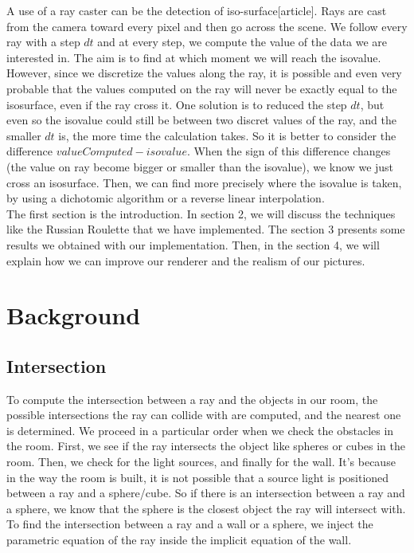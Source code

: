 \documentclass[12pt]{article}
\numberwithin{equation}{section}
\begin{document}
A use of a ray caster can be the detection of iso-surface[article]. Rays are cast from the camera toward every pixel and then go across the scene. We follow every ray with a step $dt$ and at every step, we compute the value of the data we are interested in. The aim is to find at which moment we will reach the isovalue. However, since we discretize the values along the ray, it is possible and even very probable that the values computed on the ray will never be exactly equal to the isosurface, even if the ray cross it. One solution is to reduced the step $dt$, but even so the isovalue could still be between two discret values of the ray, and the smaller $dt$ is, the more time the calculation takes. So it is better to consider the difference $valueComputed - isovalue$. When the sign of this difference changes (the value on ray become bigger or smaller than the isovalue), we know we just cross an isosurface. Then, we can find more precisely where the isovalue is taken, by using a dichotomic algorithm or a reverse linear interpolation.\\

The first section is the introduction. In section 2, we will discuss the techniques like the Russian Roulette that we have implemented. The section 3 presents some results we obtained with our implementation. Then, in the section 4, we will explain how we can improve our renderer and the realism of our pictures. 

\section{Background}

\subsection{Intersection}

To compute the intersection between a ray and the objects in our room, the possible intersections the ray can collide with are computed, and the nearest one is determined. We proceed in a particular order when we check the obstacles in the room. First, we see if the ray intersects the object like spheres or cubes in the room. Then, we check for the light sources, and finally for the wall. It's because in the way the room is built, it is not possible that a source light is positioned between a ray and a sphere/cube. So if there is an intersection between a ray and a sphere, we know that the sphere is the closest object the ray will intersect with. To find the intersection between a ray and a wall or a sphere, we inject the parametric equation of the ray inside the implicit equation of the wall.\\
\end{document}
